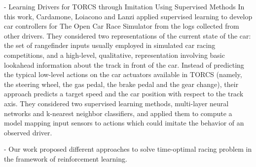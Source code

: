 - Learning Drivers for TORCS through Imitation Using Supervised Methods	
In this work, Cardamone, Loiacono and Lanzi applied supervised learning to develop car controllers for The Open Car Race Simulator from the logs collected from other drivers. 
They considered two representations of the current state of the car: the set of rangefinder inputs usually employed in simulated car racing competitions, and a high-level, qualitative, representation involving basic lookahead information about the track in front of the car. Instead of predicting the typical low-level actions on the car actuators available in TORCS (namely, the steering wheel, the gas pedal, the brake pedal and the gear change), their approach predicts a target speed and the car position with respect to the track axis.
They considered two supervised learning methods, multi-layer neural networks and k-nearest neighbor classifiers, and applied them to compute a model mapping input sensors to actions which could imitate the behavior of an observed driver.

- Our work proposed different approaches to solve time-optimal racing problem in the framework of reinforcement learning. 
